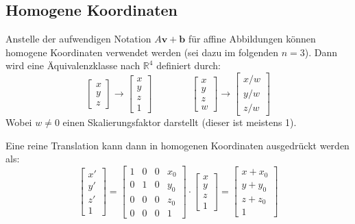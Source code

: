 \documentclass[a4paper, 11pt, accentcolor = tud3b]{tudreport}
\newcommand{\R}{\mathbb{R}}
\renewcommand{\vec}[1]{\boldsymbol{\mathbf{#1}}}
\begin{document}
			\subsection{Homogene Koordinaten}
				Anstelle der aufwendigen Notation \( A\vec{v} + \vec{b} \) für affine Abbildungen können homogene Koordinaten verwendet werden (sei dazu im folgenden \( n = 3 \)). Dann wird eine Äquivalenzklasse nach \( \R^4 \) definiert durch:
				\begin{equation*}
					\begin{bmatrix}
						x \\
						y \\
						z
					\end{bmatrix}
					\to
					\begin{bmatrix}
						x \\
						y \\
						z \\
						1
					\end{bmatrix}
					\quad\quad\quad\quad
					\begin{bmatrix}
						x \\
						y \\
						z \\
						w
					\end{bmatrix}
					\to
					\begin{bmatrix}
						x/w \\
						y/w \\
						z/w
					\end{bmatrix}
				\end{equation*}
				Wobei \( w \neq 0 \) einen Skalierungsfaktor darstellt (dieser ist meistens \num{1}).
				
				Eine reine Translation kann dann in homogenen Koordinaten ausgedrückt werden als:
				\begin{equation*}
					\begin{bmatrix}
						x' \\
						y' \\
						z' \\
						1
					\end{bmatrix}
					=
					\begin{bmatrix}
						1 & 0 & 0 & x_0 \\
						0 & 1 & 0 & y_0 \\
						0 & 0 & 0 & z_0 \\
						0 & 0 & 0 & 1
					\end{bmatrix}
					\cdot
					\begin{bmatrix}
						x \\
						y \\
						z \\
						1
					\end{bmatrix}
					=
					\begin{bmatrix}
						x + x_0 \\
						y + y_0 \\
						z + z_0 \\
						1
					\end{bmatrix}
				\end{equation*}
				
\end{document}
